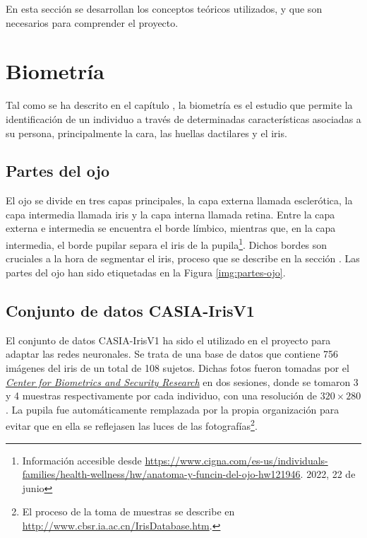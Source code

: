  \label{capitulo3}

En esta sección se desarrollan los conceptos teóricos utilizados, y que son necesarios para comprender el proyecto.

\section{Biometría}

Tal como se ha descrito en el capítulo , la biometría es el estudio que permite la identificación de un individuo a través de determinadas características asociadas a su persona, principalmente la cara, las huellas dactilares y el iris. 

\subsection{Partes del ojo} \label{partesojo} 

El ojo se divide en tres capas principales, la capa externa llamada esclerótica, la capa intermedia llamada iris y la capa interna llamada retina. Entre la capa externa e intermedia se encuentra el borde límbico, mientras que, en la capa intermedia, el borde pupilar separa el iris de la pupila\footnote{Información accesible desde \url{https://www.cigna.com/es-us/individuals-families/health-wellness/hw/anatoma-y-funcin-del-ojo-hw121946}. 2022, 22 de junio}.
Dichos bordes son cruciales a la hora de segmentar el iris, proceso que se describe en la sección .
Las partes del ojo han sido etiquetadas en la Figura \ref{img:partes-ojo}.


\subsection{Conjunto de datos CASIA-IrisV1 }	\label{casia}

El conjunto de datos CASIA-IrisV1 ha sido el utilizado en el proyecto para adaptar las redes neuronales. Se trata de una base de datos que contiene 756 imágenes del iris de un total de 108 sujetos. 
Dichas fotos fueron tomadas por el \href{http://www.cbsr.ia.ac.cn/english/index.asp}{\textit{Center for Biometrics and Security Research}} en dos sesiones, donde se tomaron 3 y 4 muestras respectivamente por cada individuo, con una resolución de $320 \times 280$. 
La pupila fue automáticamente remplazada por la propia organización para evitar que en ella se reflejasen las luces de las fotografías\footnote{El proceso de la toma de muestras se describe en \url{http://www.cbsr.ia.ac.cn/IrisDatabase.htm}.}.

